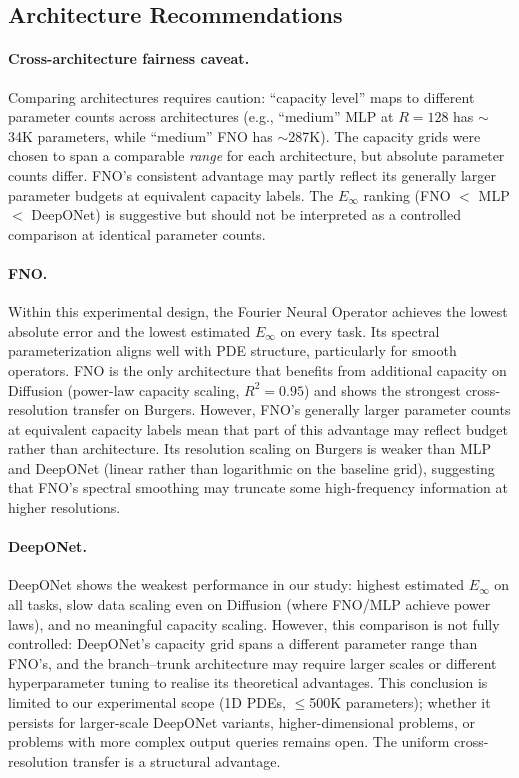 \documentclass[11pt]{article}
\newcommand{\Einf}{E_\infty}
\begin{document}
\subsection{Architecture Recommendations}

\paragraph{Cross-architecture fairness caveat.}
Comparing architectures requires caution: ``capacity level'' maps to
different parameter counts across architectures (e.g., ``medium''
MLP at $R = 128$ has $\sim$34K parameters, while ``medium'' FNO has
$\sim$287K). The capacity grids were chosen to span a comparable
\emph{range} for each architecture, but absolute parameter counts
differ. FNO's consistent advantage may partly reflect its generally
larger parameter budgets at equivalent capacity labels. The
$\Einf$ ranking (FNO $<$ MLP $<$ DeepONet) is suggestive but should
not be interpreted as a controlled comparison at identical
parameter counts.

\paragraph{FNO.}
Within this experimental design, the Fourier Neural Operator achieves
the lowest absolute error and the lowest estimated $\Einf$ on every
task. Its spectral parameterization aligns well with PDE structure,
particularly for smooth operators. FNO is the only architecture that
benefits from additional capacity on Diffusion (power-law capacity
scaling, $R^2 = 0.95$) and shows the strongest cross-resolution
transfer on Burgers. However, FNO's generally larger parameter counts
at equivalent capacity labels mean that part of this advantage may
reflect budget rather than architecture. Its resolution scaling on
Burgers is weaker than MLP and DeepONet (linear rather than
logarithmic on the baseline grid), suggesting that FNO's spectral
smoothing may truncate some high-frequency information at higher
resolutions.

\paragraph{DeepONet.}
DeepONet shows the weakest performance in our study: highest estimated
$\Einf$ on all tasks, slow data scaling even on Diffusion (where
FNO/MLP achieve power laws), and no meaningful capacity scaling.
However, this comparison is not fully controlled: DeepONet's capacity
grid spans a different parameter range than FNO's, and the
branch--trunk architecture may require larger scales or different
hyperparameter tuning to realise its theoretical advantages.
This conclusion is limited to our experimental scope (1D PDEs,
$\leq$500K parameters); whether it persists for larger-scale
DeepONet variants, higher-dimensional problems, or problems with
more complex output queries remains open. The uniform
cross-resolution transfer is a structural advantage.
\end{document}
